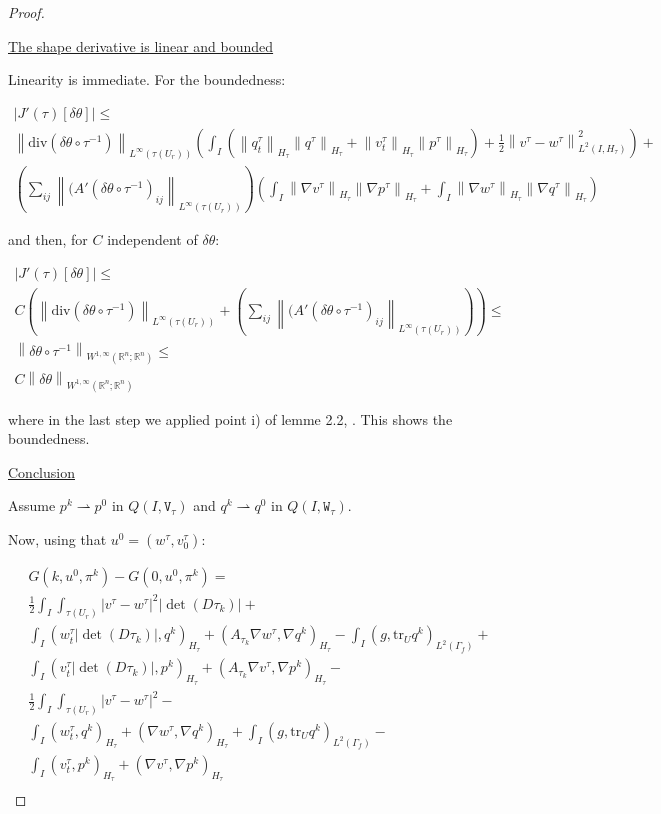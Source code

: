 \documentclass[english,a4paper,9pt,oneside]{scrbook}	%
\theoremstyle{break}
\newenvironment{mproof}[1][\proofname]{%
  \begin{proof}[#1]$ $\par\nobreak\ignorespaces
}{%
  \end{proof}
}
\renewcommand*{\proofname}{Proof}
\theoremstyle{remark}
\newcommand{\mR}{\mathbb{R}}
\newcommand{\norm}[1]{\left\lVert#1\right\rVert}
\newcommand{\tr}{\text{tr}}
\newcommand{\te}{\theta}
\newcommand{\dive}{\text{div}}
\newcommand{\weakc}{\rightharpoonup}
\newcommand{\tw}[1]{\texttt{#1}}
\begin{document}
\begin{mproof}

\underline{The shape derivative is linear and bounded}

Linearity is immediate. For the boundedness:

\begin{align*}
|J'(\tau)[\delta \te]| \leq\\ \norm{\dive(\delta \te\circ  \tau^{-1})}_{L^\infty(\tau(U_r))}\left (\int_I( \norm{q_t^\tau}_{H_\tau}\norm{q^\tau}_{H_\tau}+ \norm{v_t^\tau}_{H_\tau}\norm{p^\tau}_{H_\tau})+\frac{1}{2}\norm{v^\tau-w^\tau}^2_{L^2(I,H_\tau)}\right )+\\
\left(\sum_{ij} \norm{(A'(\delta\te \circ \tau^{-1})_{ij}}_{L^\infty(\tau(U_r))}\right )\left (
\int_I \norm{\nabla v^\tau}_{H_\tau} \norm{\nabla p^\tau}_{H_\tau}+ \int_I \norm{\nabla w^\tau}_{H_\tau} \norm{\nabla q^\tau}_{H_\tau}\right )
\end{align*}

and then, for $C$ independent of $\delta \te$:

\begin{align*}
|J'(\tau)[\delta \te]| \leq\\ C \left ( \norm{\dive(\delta \te\circ  \tau^{-1})}_{L^\infty(\tau(U_r))}+\left(\sum_{ij} \norm{(A'(\delta\te \circ \tau^{-1})_{ij}}_{L^\infty(\tau(U_r))}\right )\right )\leq\\
\norm{\delta \te \circ \tau^{-1}}_{W^{1,\infty}(\mR^n;\mR^n)}\leq \\
C\norm{\delta \te }_{W^{1,\infty}(\mR^n;\mR^n)}
\end{align*}

where in the last step we applied point i) of lemme 2.2, \cite{murat}. This shows the boundedness.

\underline{Conclusion}

Assume $p^k \weakc p^0$ in $Q(I,\tw{V}_\tau)$ and $q^k \weakc q^0$ in $Q(I,\tw{W}_\tau)$.

Now, using that $u^0=(w^\tau, v_0^\tau)$:

\begin{align*}
G(k,u^0,\pi^k)-G(0,u^0,\pi^k) =\\
\frac{1}{2}\int_I \int_{\tau(U_r)}|v^\tau-w^\tau|^2|\det(D\tau_k)|+\\
\int_I ( w_t^\tau |\det(D\tau_k)| , q^k)_{H_\tau}+ (A_{\tau_k}\nabla w^\tau, \nabla q^k)_{H_\tau} -\int_I(g,\tr_{U} q^k)_{L^2(\Gamma_f)} +\\ \int_I (v_t^\tau |\det(D\tau_k)|,p^k )_{H_\tau} + (A_{\tau_k} \nabla v^\tau, \nabla p^k)_{H_\tau} - \\
\frac{1}{2}\int_I \int_{\tau(U_r)}|v^\tau-w^\tau|^2-\\
\int_I ( w_t^\tau , q^k )_{H_\tau}+(\nabla w^\tau, \nabla q^k)_{H_\tau} +\int_I(g,\tr_{U} q^k)_{L^2(\Gamma_f)} -\\ \int_I (v_t^\tau,p^k )_{H_\tau} + ( \nabla v^\tau, \nabla p^k)_{H_\tau} \\
\end{align*}


\end{mproof}
\end{document}
